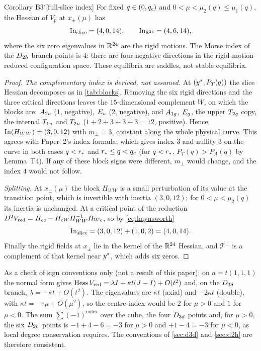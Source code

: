 \begin{named}{Corollary B3$'$}[full-slice index]\label{cor:B3}
For fixed $q\in(0,q_{c})$ and $0<\mu<\mu_2(q)\le\mu_1(q)$, the Hessian of $V_p$ at $x_\pm(\mu)$ has
\[
\operatorname{In}_{\mathrm{slice}}=(4,0,14),\qquad \operatorname{In}_{\mathbb{R}^{24}}=(4,6,14),
\]
where the six zero eigenvalues in $\mathbb{R}^{24}$ are the rigid motions. The Morse index of the $D_{2h}$ branch points is $4$:
there are four negative directions in the rigid-motion-reduced configuration space. These equilibria are saddles, not
stable equilibria.
\end{named}

\begin{proof}
\emph{The complementary index is derived, not assumed.} At $(y^{*},P_T(q))$ the slice Hessian decomposes as in
\cref{tab:blocks}. Removing the six rigid directions and the three critical directions leaves the $15$-dimensional
complement $W$, on which the blocks are: $A_{2u}$ ($1$, negative), $E_{u}$ ($2$, negative), and $A_{1g}$, $E_{g}$, the upper
$T_{2g}$ copy, the internal $T_{1u}$ and $T_{2u}$ ($1+2+3+3+3=12$, positive). Hence $\operatorname{In}(H_{WW})=(3,0,12)$ with $m_\perp=3$,
constant along the whole physical curve. This agrees with Paper~2's index formula, which gives index $3$ and nullity $3$
on the curve in both cases $q<r_{*}$ and $r_{*}\le q<q_{c}$ (for $q<r_{*}$, $P_T(q)>P_A(q)$ by Lemma~T4). If any of these block
signs were different, $m_\perp$ would change, and the index $4$ would not follow.

\emph{Splitting.} At $x_\pm(\mu)$ the block $H_{WW}$ is a small perturbation of its value at the transition point, which is
invertible with inertia $(3,0,12)$; for $0<\mu<\mu_2(q)$ its inertia is unchanged. At a critical point of the reduction
$D^2V_{\mathrm{red}}=H_{cc}-H_{cW}H_{WW}^{-1}H_{Wc}$, so by \eqref{eq:haynsworth}
\[
\operatorname{In}_{\mathrm{slice}}=(3,0,12)+(1,0,2)=(4,0,14).
\]
Finally the rigid fields at $x_\pm$ lie in the kernel of the $\mathbb{R}^{24}$ Hessian, and $\mathcal T^\perp$ is a complement of
that kernel near $y^{*}$, which adds six zeros.
\end{proof}

\begin{remark}\label{rem:d3d}
As a check of sign conventions only (not a result of this paper): on $a=t(1,1,1)$ the normal form gives
$\operatorname{Hess}V_{\mathrm{red}}=\lambda I+\kappa t(J-I)+O(t^2)$ and, on the $D_{3d}$ branch, $\lambda=-\kappa t+O(t^2)$. The
eigenvalues are $\kappa t$ (axial) and $-2\kappa t$ (double), with $\kappa t=-\tau\mu+O(\mu^2)$, so the centre index would be
$2$ for $\mu>0$ and $1$ for $\mu<0$. The sum $\sum(-1)^{\mathrm{index}}$ over the cube, the four $D_{3d}$ points and, for
$\mu>0$, the six $D_{2h}$ points is $-1+4-6=-3$ for $\mu>0$ and $+1-4=-3$ for $\mu<0$, as local degree conservation
requires. The conventions of \cref{sec:d3d} and \cref{sec:d2h} are therefore consistent.
\end{remark}

